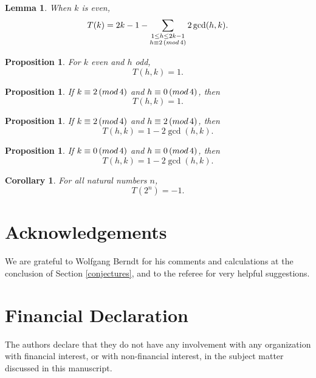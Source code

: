\documentclass[11pt,reqno]{amsart}
\renewcommand{\pmod}[1]{\,(\textup{mod}\,#1)}
\theoremstyle{plain}
\numberwithin{equation}{section}
\newtheorem{proposition}[theorem]{Proposition}
\newtheorem{corollary}[theorem]{Corollary}
\newtheorem{lemma}[theorem]{Lemma}
\begin{document}
\begin{lemma}\label{even} When $k$ is even,
$$T(k)=
2k-1 - \sum\limits_{\substack{1\leq h \leq 2k - 1 \\ h \equiv 2 \pmod{4}}}  2\gcd(h,k).$$
\end{lemma}

\begin{proposition} For $k$ even and $h$ odd,
$$T(h,k) = 1. $$
\end{proposition}


\begin{proposition} If $k \equiv 2 \pmod 4$ and $h \equiv 0 \pmod 4$, then
$$T(h,k) = 1. $$
\end{proposition}


\begin{proposition}
If $k \equiv 2 \pmod 4$ and $h \equiv 2 \pmod 4$, then
$$T( h,k) = 1 - 2 \gcd(h,k).$$
\end{proposition}

\begin{proposition}
If $k \equiv 0 \pmod 4$ and $h\equiv 0\pmod 4$, then %
$$T( h,k) = 1 - 2 \gcd(h,k).$$
\end{proposition}

\begin{corollary}
    For all natural numbers $n$,
$$T\left(2^n\right) = -1.$$
\end{corollary}

\section{Acknowledgements}  We are grateful to Wolfgang Berndt for his comments and calculations at the conclusion of Section \ref{conjectures}, and to the referee for very helpful suggestions.

\section{Financial Declaration}  The authors declare that they do not have any involvement with any organization 
with financial interest, or with non-financial interest, in the subject matter discussed in this manuscript.
\end{document}
